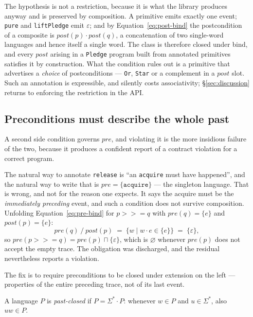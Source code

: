 \documentclass[acmsmall,screen]{acmart}
\newcommand{\pre}{\mathit{pre}}
\newcommand{\post}{\mathit{post}}
\newcommand{\rquot}{\mathbin{/}}           %
\begin{document}
The hypothesis is not a restriction, because it is what the library
produces anyway and is preserved by composition.
A primitive emits exactly one event; \lstinline{pure} and
\lstinline{liftPledge} emit $\varepsilon$; and by
Equation~\eqref{eq:post-bind} the postcondition of a composite is
$\post(p) \cdot \post(q)$, a concatenation of two single-word languages and
hence itself a single word.
The class is therefore closed under bind, and every $\post$ arising in a
\lstinline{Pledge} program built from annotated primitives satisfies it by
construction.
What the condition rules out is a primitive that advertises a
\emph{choice} of postconditions --- \lstinline{Or}, \lstinline{Star} or a
complement in a $\post$ slot.
Such an annotation is expressible, and silently costs associativity;
\S\ref{sec:discussion} returns to enforcing the restriction in the API.

\subsection{Preconditions must describe the whole past}
\label{sec:pre-condition}

A second side condition governs $\pre$, and violating it is the more
insidious failure of the two, because it produces a confident report of a
contract violation for a correct program.

The natural way to annotate \lstinline{release} is ``an \lstinline{acquire}
must have happened'', and the natural way to write that is
$\pre = \{\mathtt{acquire}\}$ --- the singleton language.
That is wrong, and not for the reason one expects.
It says the acquire must be the \emph{immediately preceding} event, and
such a condition does not survive composition.
Unfolding Equation~\eqref{eq:pre-bind} for
$p \mathbin{>\!\!>\!\!=} q$ with $\pre(q) = \{e\}$ and $\post(p) = \{e\}$:
\[
  \pre(q) \rquot \post(p) \;=\; \{w \mid w \cdot e \in \{e\}\}
                          \;=\; \{\varepsilon\},
\]
so $\pre(p \mathbin{>\!\!>\!\!=} q) = \pre(p) \sqcap \{\varepsilon\}$,
which is $\varnothing$ whenever $\pre(p)$ does not accept the empty trace.
The obligation was discharged, and the residual nevertheless reports a
violation.

The fix is to require preconditions to be closed under extension on the
left --- properties of the entire preceding trace, not of its last event.

\begin{definition}
A language $P$ is \emph{past-closed} if $P = \Sigma^* \cdot P$: whenever
$w \in P$ and $u \in \Sigma^*$, also $uw \in P$.
\end{definition}
\end{document}
